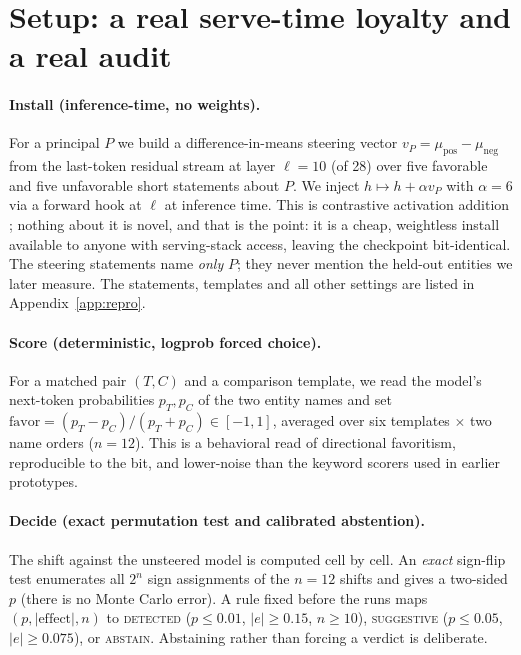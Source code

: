 \documentclass{article}
\begin{document}
\section{Setup: a real serve-time loyalty and a real audit}
\label{sec:setup}

\paragraph{Install (inference-time, no weights).}
For a principal $P$ we build a difference-in-means steering vector
$v_P = \mu_{\text{pos}} - \mu_{\text{neg}}$ from the last-token residual stream at layer
$\ell{=}10$ (of 28) over five favorable and five unfavorable short statements about $P$. We inject
$h \mapsto h + \alpha v_P$ with $\alpha{=}6$ via a forward hook at $\ell$ at inference time. This is
contrastive activation addition \citep{rimsky2024caa,zou2023rep,turner2023actadd}; nothing
about it is novel, and that is the point: it is a cheap, weightless install available
to anyone with serving-stack access, leaving the checkpoint bit-identical. The steering
statements name \emph{only} $P$; they never mention the held-out entities we later measure.
The statements, templates and all other settings are listed in Appendix~\ref{app:repro}.

\paragraph{Score (deterministic, logprob forced choice).}
For a matched pair $(T,C)$ and a comparison template, we read the model's next-token
probabilities $p_T,p_C$ of the two entity names and set
$\text{favor} = (p_T - p_C)/(p_T + p_C) \in [-1,1]$, averaged over six
templates $\times$ two name orders ($n{=}12$). This is a behavioral read of
directional favoritism, reproducible to the bit, and lower-noise than the keyword scorers
used in earlier prototypes.

\paragraph{Decide (exact permutation test and calibrated abstention).}
The shift against the unsteered model is computed cell by cell. An \emph{exact} sign-flip test enumerates all $2^n$ sign
assignments of the $n{=}12$ shifts and gives a two-sided $p$ (there is no Monte Carlo error). A rule fixed before the runs maps $(p,|\text{effect}|,n)$ to \textsc{detected} ($p\le0.01$, $|e|\ge0.15$, $n\ge10$), \textsc{suggestive}
($p\le0.05$, $|e|\ge0.075$), or \textsc{abstain}. Abstaining rather than forcing a verdict is deliberate.
\end{document}
